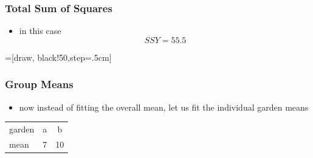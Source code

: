 \begin{frame}\frametitle{Total Sum of Squares}
  \begin{itemize}
  \item in this case $$SSY = 55.5$$
  \end{itemize}
   =[draw, black!50,step=.5cm]
\end{frame}

\begin{frame}\frametitle{Group Means}
  \begin{itemize}
  \item now instead of fitting the overall mean, let us fit the individual garden means
  \end{itemize}
\begin{table}[ht]
\centering
\begin{tabular}{lcc}
  \hline
garden & a & b \\ 
  mean &  7 & 10 \\ 
   \hline
\end{tabular}
\end{table}
\end{frame}

